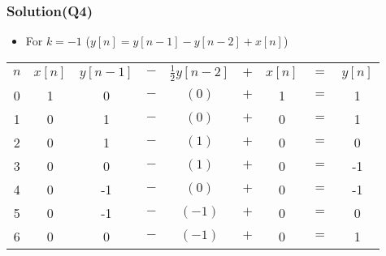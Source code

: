 \documentclass{beamer}
\begin{document}
\begin{frame}
\frametitle{Solution(Q4)}

\begin{itemize} \itemsep1pt \parskip0pt 
  \item[] For $k = -1$ ($y[n]=y[n-1]-y[n-2]+x[n]$)
\end{itemize}

\begin{table}
\def\arraystretch{1.5}
\begin{tabular}{ccccccccc}
\hline
$n$ & $x[n]$ & $y[n-1]$ & $-$ & $\frac{1}{2}y[n-2]$ & $+$ & $x[n]$ & $=$ & $y[n]$ \\

0 & 1 & 0 & $-$ & $(0)$ & $+$ & 1 & $=$ & 1 \\ 

1 & 0 & 1 & $-$ & $(0)$ & $+$ & 0 & $=$ & 1 \\ 

2 & 0 & 1 & $-$ & $(1)$ & $+$ & 0 & $=$ & 0 \\ 

3 & 0 & 0 & $-$ & $(1)$ & $+$ & 0 & $=$ & -1 \\ 

4 & 0 & -1 & $-$ & $(0)$ & $+$ & 0 & $=$ & -1 \\ 
5 & 0 & -1 & $-$ & $(-1)$ & $+$ & 0 & $=$ & 0 \\ 

6 & 0 & 0 & $-$ & $(-1)$ & $+$ & 0 & $=$ & 1 \\ 
\hline
\end{tabular}
\end{table}


\end{frame}

\end{document}
